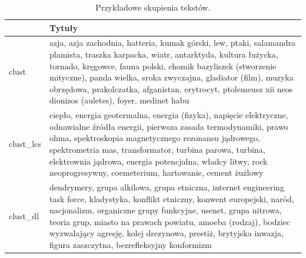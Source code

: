 \documentclass{praca1}
\begin{document}
{}
\begin{longtable}{|L{0.5cm}|L{15cm}|} %
\caption{Przykładowe skupienia tekstów.} 
\label{tab:007} \\
  \hline
  & Tytuły \\ %
  \hline
\begin{sideways}clust\end{sideways} & azja, azja zachodnia, hatteria, kumak górski, lew, ptaki, salamandra plamista, traszka karpacka, wiatr, antarktyda, kultura łużycka, tornado, kręgowce, fauna polski, chomik bazyliszek (stworzenie mityczne), panda wielka, sroka zwyczajna, gladiator (film), muzyka obrzędowa, prakolczatka, afganistan, erytrocyt, ptolemeusz xii neos dionizos (auletes), foyer, medinet habu \\ %
   \hline
\begin{sideways}clust\_lcs\end{sideways} & ciepło, energia geotermalna, energia (fizyka), napięcie elektryczne, odnawialne źródła energii, pierwsza zasada termodynamiki, prawo ohma, spektroskopia magnetycznego rezonansu jądrowego, spektrometria mas, transformator, turbina parowa, turbina, elektrownia jądrowa, energia potencjalna, władcy litwy, rock neoprogresywny, coemeterium, hartowanie, cement żużlowy \\ %
   \hline
\begin{sideways}clust\_dl\end{sideways} & dendrymery, grupa alkilowa, grupa etniczna, internet engineering task force, kladystyka, konflikt etniczny, konwent europejski, naród, nacjonalizm, organiczne grupy funkcyjne, usenet, grupa nitrowa, teoria grup, miasto na prawach powiatu, amoeba (rodzaj), bodziec wyzwalający agresję, kolej drezynowa, prestiż, brytyjska inwazja, figura zaszczytna, bezrefleksyjny konformizm\\ %

\end{longtable}
\end{document}
